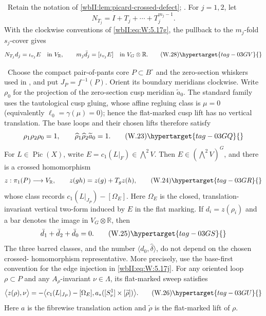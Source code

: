 
\begin{lemma}
\hypertarget{tag-03IE}{}\label{wbII:lem:picard-finite-norm}


\ Retain the notation of
\cref{wbII:lem:picard-crossed-defect}; .  For
$j=1,2$, let
\[
 N_{T_j}=I+T_j+\cdots+T_j^{m_j-1}.
\]
With the clockwise conventions of \eqref{wbII:eq:W:5.17g}, the pullback to the
$m_j$-fold $s_j$-cover gives
\[
 N_{T_j}d_j=\iota_{v_j}E
 \quad\text{in }V_{\mathbb R},
\qquad
 m_j\bar d_j=[\iota_{v_j}E]
 \quad\text{in }V_G\otimes\mathbb R.
\tag{W.28}\hypertarget{tag-03GV}{}\label{wbII:eq:W:5.17k}
\]
\end{lemma}

\begin{lemma}
\hypertarget{tag-03IC}{}\label{wbII:lem:picard-crossed-defect}


\ Choose the compact pair-of-pants core $P\subset B^\circ$ and
the zero-section whiskers used in , and put
$J_P=f^{-1}(P)$.  Orient its boundary meridians clockwise.  Write
$\rho_0$ for the projection of the zero-section cusp meridian
$\widetilde a_0$.  The standard family uses the tautological cusp
gluing, whose affine regluing class is $\mu=0$ (equivalently
$\ell_0=\gamma(\mu)=0$); hence the flat-marked cusp lift has no vertical
translation.  The base loops and their chosen lifts therefore satisfy
\[
 \rho_1\rho_2\rho_0=1,
 \qquad
 \widehat\rho_1\widehat\rho_2\widetilde a_0=1.
\tag{W.23}\hypertarget{tag-03GQ}{}\label{wbII:eq:W:5.17g}
\]
For $L\in\operatorname{Pic}(X)$, write
$E=c_1(L|_F)\in\bigwedge^2V$.  Then $E\in(\bigwedge^2V)^G$, and there is a
crossed homomorphism
\[
 z:\pi_1(P)\longrightarrow V_{\mathbb R},\qquad
 z(gh)=z(g)+T_gz(h),
\tag{W.24}\hypertarget{tag-03GR}{}\label{wbII:eq:W:5.17h}
\]
whose class records
$c_1(L|_{J_P})-[\Omega_E]$.  Here $\Omega_E$ is the closed, translation-
invariant vertical two-form induced by $E$ in the flat marking.  If
$d_i=z(\rho_i)$ and a bar denotes the image in
$V_G\otimes\mathbb R$, then
\[
 \bar d_1+\bar d_2+\bar d_0=0.
\tag{W.25}\hypertarget{tag-03GS}{}\label{wbII:eq:W:5.17i}
\]
The three barred classes, and the number
$\langle d_0,\widehat\delta\rangle$, do not depend on the chosen crossed-
homomorphism representative.  More precisely, use the base-first convention
for the edge injection in \eqref{wbII:eq:W:5.17j}.  For any oriented loop $\rho\subset P$
and any $A_\rho$-invariant $\nu\in\Lambda$, its flat-marked sweep satisfies
\[
 \bigl\langle z(\rho),\nu\bigr\rangle
 =-\bigl\langle c_1(L|_{J_P})-[\Omega_E],
 a_*([S^1_\nu]\times[\widetilde\rho])\bigr\rangle.
\tag{W.26}\hypertarget{tag-03GU}{}\label{wbII:eq:W:5.17j'}
\]
Here $a$ is the fibrewise translation action and $\widetilde\rho$ is the
flat-marked lift of $\rho$.
\end{lemma}

